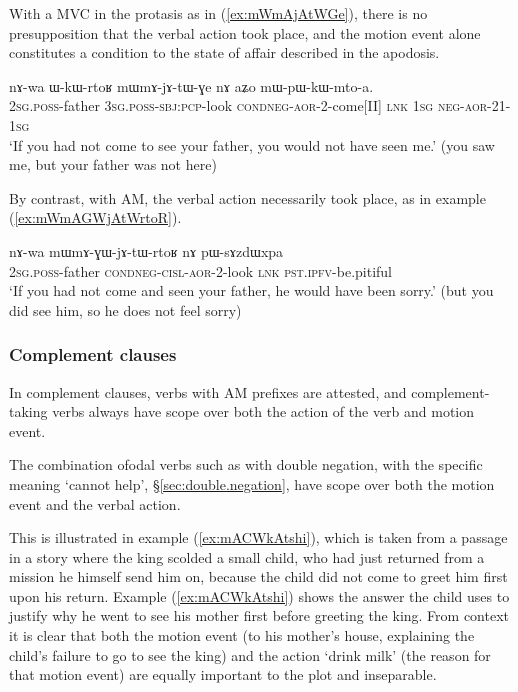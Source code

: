 With a MVC in the protasis as in (\ref{ex:mWmAjAtWGe}), there is no presupposition that the verbal action took place, and the motion event alone constitutes a condition to the state of affair described in the apodosis.

\begin{exe}
\ex \label{ex:mWmAjAtWGe}
\gll nɤ-wa ɯ-kɯ-rtoʁ mɯ\redp{}mɤ-jɤ-tɯ-ɣe nɤ aʑo mɯ-pɯ-kɯ-mto-a. \\
\textsc{2sg}.\textsc{poss}-father \textsc{3sg}.\textsc{poss}-\textsc{sbj}:\textsc{pcp}-look \textsc{cond}\redp{}\textsc{neg}-\textsc{aor}-2-come[II] \textsc{lnk} \textsc{1sg} \textsc{neg}-\textsc{aor}-2\fl{}1-\textsc{1sg} \\
\glt `If you had not come to see your father, you would not have seen me.' (you saw me, but your father was not here)
\end{exe}

By contrast, with AM, the verbal action necessarily took place, as in example (\ref{ex:mWmAGWjAtWrtoR}).

\begin{exe}
\ex \label{ex:mWmAGWjAtWrtoR}
\gll nɤ-wa  mɯ\redp{}mɤ-ɣɯ-jɤ-tɯ-rtoʁ nɤ pɯ-sɤzdɯxpa \\
\textsc{2sg}.\textsc{poss}-father \textsc{cond}\redp{}\textsc{neg}-\textsc{cisl}-\textsc{aor}-2-look \textsc{lnk} \textsc{pst}.\textsc{ipfv}-be.pitiful \\ 
\glt `If you had not come and seen your father, he would have been sorry.' (but you did see him, so he does not feel sorry)
\end{exe}

\subsubsection{Complement clauses} \label{sec:am.complement}
In complement clauses, verbs with AM prefixes are attested, and complement-taking verbs always have scope over both the action of the verb and motion event.

The combination ofodal verbs such as  with double negation, with the specific meaning `cannot help', §\ref{sec:double.negation}, have scope over both the motion event and the verbal action. 

This is illustrated in example (\ref{ex:mACWkAtshi}), which is taken from a passage in a story where the king scolded a small child, who had just returned from a mission he himself send him on, because the child did not come to greet him first upon his return. Example (\ref{ex:mACWkAtshi}) shows the answer the child uses to justify why he went to see his mother first before greeting the king. From  context it is clear that both the motion event (to his mother's house, explaining the child's failure to go to see the king) and the action `drink milk' (the reason for that motion event) are equally important to the plot and inseparable. 

